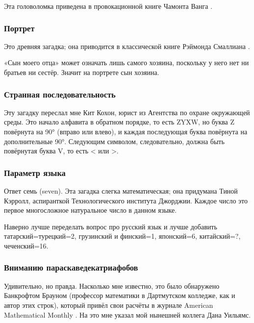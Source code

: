 Эта головоломка приведена в провокационной книге Чамонта Ванга \cite{wang}.

\subsubsection*{Портрет}

Это древняя загадка;
она приводится в классической книге Рэймонда Смаллиана \cite{smullyan}.

«Сын моего отца» может означать лишь самого хозяина, поскольку у него нет ни братьев ни сестёр.
Значит на портрете сын хозяина.

\subsubsection*{Странная последовательность}

Эту загадку переслал мне Кит Кохон, юрист из Агентства по охране окружающей среды.
Это начало алфавита в обратном порядке, то есть ZYXW, но буква Z повёрнута на 90° (вправо или влево), и каждая последующая буква повёрнута на дополнительные 90°.
Следующим символом, следовательно, должна быть повёрнутая буква V, то есть < или >.

\subsubsection*{Параметр языка}

Ответ семь (seven).
Эта загадка слегка математическая;
она придумана Тиной Кэрролл, аспиранткой Технологического института Джорджии. 
Каждое число это первое многосложное натуральное число в данном языке.

\begin{addedbytheeditors}
Наверно лучше переделать вопрос про русский язык и лучше добавить татарский=турецкий=2, грузинский и финский=1, японский=6, китайский=?, чеченский=16.
\end{addedbytheeditors}


\subsubsection*{Вниманию параскаведекатриафобов}

Удивительно, но правда.
Насколько мне известно, это было обнаружено Банкрофтом Брауном (профессор математики в Дартмутском колледже, как и автор этих строк), который привёл свои расчёты в журнале American Mathematical Monthly \cite{brown}.
На это мне указал мой нынешней коллега Дана Уильямс.

